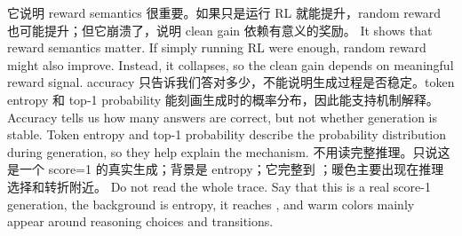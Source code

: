 {}\markdownRendererInterblockSeparator
{}\markdownRendererInterblockSeparator
{}它说明 reward semantics 很重要。如果只是运行 RL 就能提升，random reward 也可能提升；但它崩溃了，说明 clean gain 依赖有意义的奖励。\markdownRendererInterblockSeparator
{}\markdownRendererInterblockSeparator
{}It shows that reward semantics matter. If simply running RL were enough, random reward might also improve. Instead, it collapses, so the clean gain depends on meaningful reward signal.\markdownRendererInterblockSeparator
{}\markdownRendererInterblockSeparator
{}\markdownRendererInterblockSeparator
{}accuracy 只告诉我们答对多少，不能说明生成过程是否稳定。token entropy 和 top-1 probability 能刻画生成时的概率分布，因此能支持机制解释。\markdownRendererInterblockSeparator
{}\markdownRendererInterblockSeparator
{}Accuracy tells us how many answers are correct, but not whether generation is stable. Token entropy and top-1 probability describe the probability distribution during generation, so they help explain the mechanism.\markdownRendererInterblockSeparator
{}\markdownRendererInterblockSeparator
{}\markdownRendererInterblockSeparator
{}不用读完整推理。只说这是一个 score=1 的真实生成；背景是 entropy；它完整到 ；暖色主要出现在推理选择和转折附近。\markdownRendererInterblockSeparator
{}\markdownRendererInterblockSeparator
{}Do not read the whole trace. Say that this is a real score-1 generation, the background is entropy, it reaches , and warm colors mainly appear around reasoning choices and transitions.\markdownRendererDocumentEnd